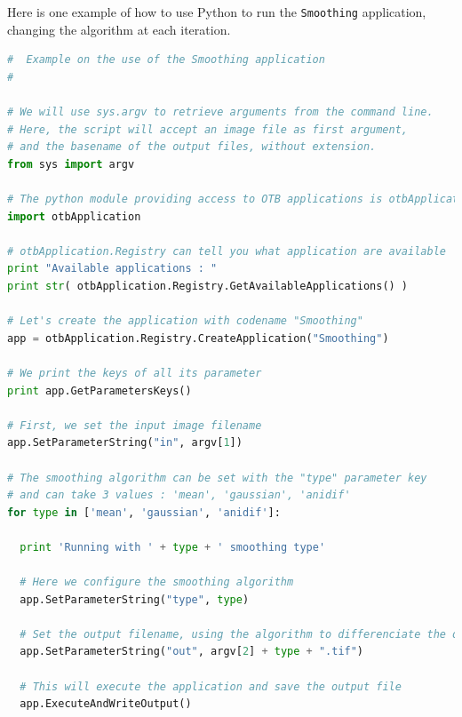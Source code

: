 Here is one example of how to use Python to run the \verb?Smoothing? application, changing the algorithm
at each iteration.

\begin{lstlisting}[language=python,breaklines=true,breakatwhitespace=true,frame = tb,framerule = 0.25pt,fontadjust,backgroundcolor={\color{listlightgray}},basicstyle = {\ttfamily\scriptsize},keywordstyle = {\ttfamily\color{listkeyword}\textbf},identifierstyle = {\ttfamily},commentstyle = {\ttfamily\color{listcomment}\textit},stringstyle = {\ttfamily},showstringspaces = false,showtabs = false,numbers = none,numbersep = 6pt, numberstyle={\ttfamily\color{listnumbers}},tabsize = 2]
#  Example on the use of the Smoothing application
#

# We will use sys.argv to retrieve arguments from the command line.
# Here, the script will accept an image file as first argument,
# and the basename of the output files, without extension.
from sys import argv

# The python module providing access to OTB applications is otbApplication
import otbApplication

# otbApplication.Registry can tell you what application are available
print "Available applications : "
print str( otbApplication.Registry.GetAvailableApplications() )

# Let's create the application with codename "Smoothing"
app = otbApplication.Registry.CreateApplication("Smoothing")

# We print the keys of all its parameter
print app.GetParametersKeys()

# First, we set the input image filename
app.SetParameterString("in", argv[1])

# The smoothing algorithm can be set with the "type" parameter key
# and can take 3 values : 'mean', 'gaussian', 'anidif'
for type in ['mean', 'gaussian', 'anidif']:

  print 'Running with ' + type + ' smoothing type'

  # Here we configure the smoothing algorithm
  app.SetParameterString("type", type)

  # Set the output filename, using the algorithm to differenciate the outputs
  app.SetParameterString("out", argv[2] + type + ".tif")

  # This will execute the application and save the output file
  app.ExecuteAndWriteOutput()

\end{lstlisting}




